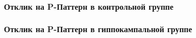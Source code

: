 \documentclass[smaller]{beamer}
\begin{document}
\begin{frame}
  \frametitle{Отклик на P-Паттерн в контрольной группе}
\begin{figure}[h]
\noindent{}
\end{figure}
\end{frame}

\begin{frame}
  \frametitle{Отклик на P-Паттерн в гиппокампальной группе}
\begin{figure}[h]
\noindent{}
\end{figure}
\end{frame}
\end{document}
